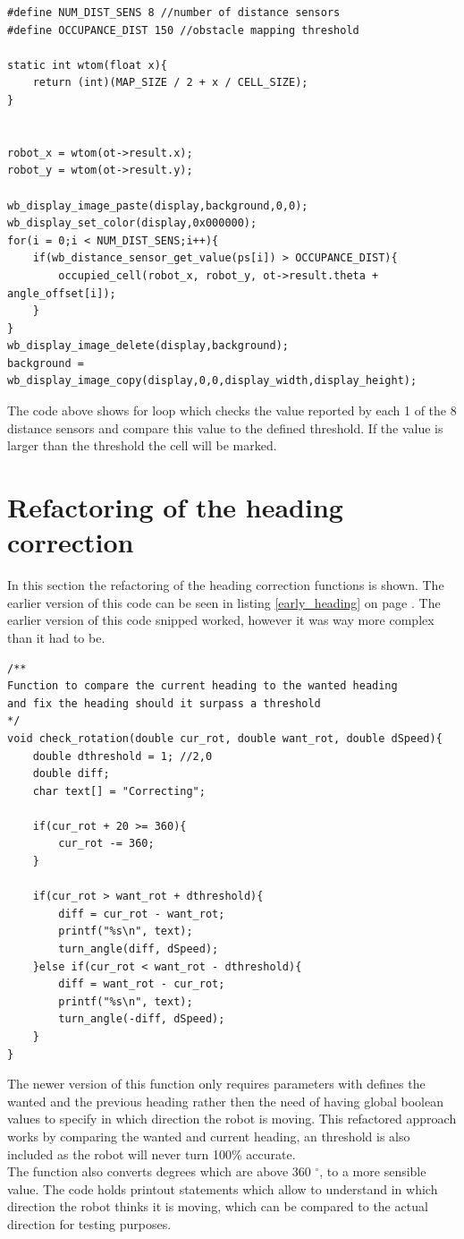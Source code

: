 \begin{lstlisting}[caption={obstacle detection and mapping}]
#define NUM_DIST_SENS 8 //number of distance sensors 
#define OCCUPANCE_DIST 150 //obstacle mapping threshold

static int wtom(float x){
	return (int)(MAP_SIZE / 2 + x / CELL_SIZE);
}


robot_x = wtom(ot->result.x);
robot_y = wtom(ot->result.y);

wb_display_image_paste(display,background,0,0);
wb_display_set_color(display,0x000000);
for(i = 0;i < NUM_DIST_SENS;i++){
	if(wb_distance_sensor_get_value(ps[i]) > OCCUPANCE_DIST){
		occupied_cell(robot_x, robot_y, ot->result.theta + angle_offset[i]);
	}
}
wb_display_image_delete(display,background);
background = wb_display_image_copy(display,0,0,display_width,display_height); 
\end{lstlisting}

The code above shows for loop which checks the value reported by each 1 of the 8 distance sensors and compare this value to the defined threshold. If the value is larger than the threshold the cell will be marked. 

\section{Refactoring of the heading correction}
In this section the refactoring of the heading correction functions is shown. 
The earlier version of this code can be seen in listing \ref{early_heading} on page \pageref{early_heading}.
The earlier version of this code snipped worked, however it was way more complex than it had to be. 

\begin{lstlisting}[caption={Refactored heading control code} ]
/**
Function to compare the current heading to the wanted heading
and fix the heading should it surpass a threshold
*/
void check_rotation(double cur_rot, double want_rot, double dSpeed){
	double dthreshold = 1; //2,0
	double diff;
	char text[] = "Correcting";
	
	if(cur_rot + 20 >= 360){
		cur_rot -= 360; 
	} 
	
	if(cur_rot > want_rot + dthreshold){
		diff = cur_rot - want_rot;
		printf("%s\n", text);
		turn_angle(diff, dSpeed);
	}else if(cur_rot < want_rot - dthreshold){
		diff = want_rot - cur_rot;
		printf("%s\n", text);
		turn_angle(-diff, dSpeed);
	}
}
\end{lstlisting}

The newer version of this function only requires parameters with defines the wanted and the previous heading rather then the need of having global boolean values to specify in which direction the robot is moving. 
This refactored approach works by comparing the wanted and current heading, an threshold is also included as the robot will never turn 100\% accurate. \\
The function also converts degrees which are above 360 $^{\circ}$, to a more sensible value. 
The code holds printout statements which allow to understand in which direction the robot thinks it is moving, which can be compared to the actual direction for testing purposes. \\[3ex]

